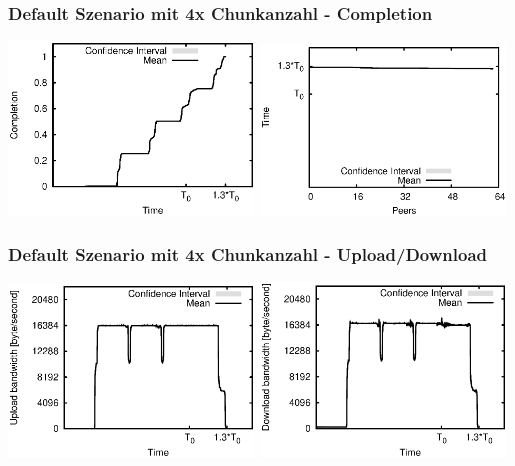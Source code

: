 \begin{frame}
  \frametitle{Default Szenario mit 4x Chunkanzahl - Completion}
  \begin{center}
    \includegraphics[width=0.49\textwidth]{fig/plots/scenario_15_chunk_count_fac_4/plots/GeneratedMeanChunkCompletion.csv.eps}
    \hfill
    \includegraphics[width=0.49\textwidth]{fig/plots/scenario_15_chunk_count_fac_4/plots/GeneratedMeanSortedChunkCompletion.csv.eps}
  \end{center}
\end{frame}


\begin{frame}
  \frametitle{Default Szenario mit 4x Chunkanzahl - Upload/Download}
  \begin{center}
    \includegraphics[width=0.49\textwidth]{fig/plots/scenario_15_chunk_count_fac_4/plots/GeneratedMeanCurrentUploadBandwidth.csv.eps}
    \includegraphics[width=0.49\textwidth]{fig/plots/scenario_15_chunk_count_fac_4/plots/GeneratedMeanCurrentDownloadBandwidth.csv.eps}
  \end{center}
\end{frame}


